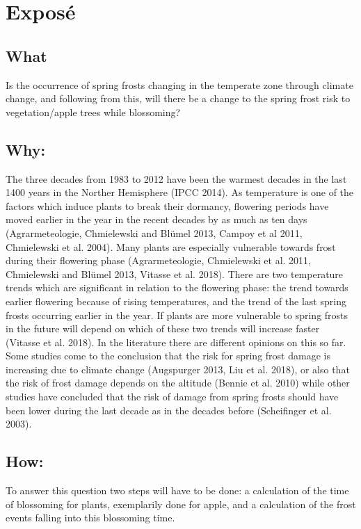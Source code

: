 \chapter {Exposé}

\section{What}
Is the occurrence of spring frosts changing in the temperate zone through climate change, and following from this, will there be a change to the spring frost risk to vegetation/apple trees while blossoming? \\

\section{{Why:}} 
The three decades from 1983 to 2012 have been the warmest decades in the last 1400 years in the Norther Hemisphere (IPCC 2014). As temperature is one of the factors which induce plants to break their dormancy, flowering periods have moved earlier in the year in the recent decades by as much as ten days \cite{Chmielewski2013} (Agrarmeteologie, Chmielewski and Blümel 2013, Campoy et al 2011, Chmielewski et al. 2004). 
Many plants are especially vulnerable towards frost during their flowering phase (Agrarmeteologie, Chmielewski et al. 2011, Chmielewski and Blümel 2013, Vitasse et al. 2018). There are two temperature trends which are significant in relation to the flowering phase: the trend towards earlier flowering because of rising temperatures, and the trend of the last spring frosts occurring earlier in the year. If plants are more vulnerable to spring frosts in the future will depend on which of these two trends will increase faster (Vitasse et al. 2018). In the literature there are different opinions on this so far. Some studies come to the conclusion that the risk for spring frost damage is increasing due to climate change (Augspurger 2013, Liu et al. 2018), or also that the risk of frost damage depends on the altitude (Bennie et al. 2010) while other studies have concluded that the risk of damage from spring frosts should have been lower during the last decade as in the decades before (Scheifinger et al. 2003). \\

\section{{How:} }To answer this question two steps will have to be done: a calculation of the time of blossoming for plants, exemplarily done for apple, and a calculation of the frost events falling into this blossoming time. \\

